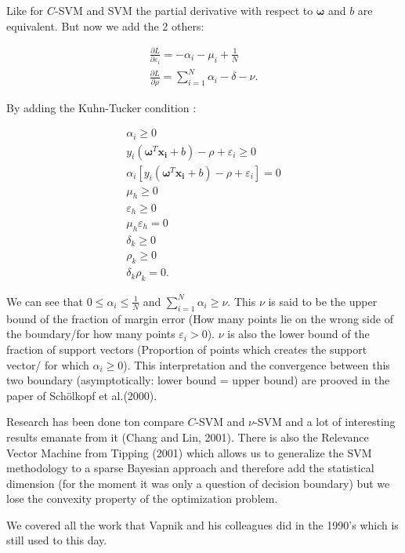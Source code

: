 \documentclass[a4paper,12pt]{article}
\numberwithin{equation}{section}
\begin{document}
Like for $C$-SVM and SVM the partial derivative with respect to $\boldsymbol{\omega}$ and $b$ are equivalent. But now we add the 2 others:

\begin{align*}
 \frac{\partial L}{\partial{\varepsilon_i} } = -\alpha_i - \mu_i + \frac{1}{N}\\
 \frac{\partial L}{\partial{\rho} } = \sum_{i=1}^{N}\alpha_i - \delta - \nu.  
\end{align*}


By adding the Kuhn-Tucker condition :

\begin{align*}
  \alpha_i \geq 0 \\
  y_i(\boldsymbol{\omega}^T\boldsymbol{x_i}+b)-\rho + \varepsilon_i \geq 0 \\
  \alpha_i[y_i(\boldsymbol{\omega}^T\boldsymbol{x_i}+b)-\rho + \varepsilon_i] = 0 \\
  \mu_h \geq 0 \\
  \varepsilon_h \geq 0 \\
  \mu_h\varepsilon_h = 0 \\
  \delta_k \geq 0 \\
  \rho_k \geq 0 \\
  \delta_k\rho_k = 0.
\end{align*}

We can see that $ 0 \leq \alpha_i \leq \frac{1}{N} $ and $\sum_{i=1}^N\alpha_i \geq \nu $. This $\nu$ is said to be the upper bound of the fraction of margin error (How many points lie on the wrong side of the boundary/for how many points $ \varepsilon_i > 0$). $\nu$ is also the lower bound of the fraction of support vectors (Proportion of points which creates the support vector/ for which $\alpha_i \ge 0$). This interpretation and the convergence between this two boundary (asymptotically: lower bound = upper bound) are prooved in the paper of Sch{\"o}lkopf et al.(2000).

Research has been done ton compare $C$-SVM and $\nu$-SVM and a lot of interesting results emanate from it (Chang and Lin, 2001). There is also the Relevance Vector Machine from Tipping (2001) which allows us to generalize the SVM methodology to a sparse Bayesian approach and therefore add the statistical dimension (for the moment it was only a question of decision boundary) but we lose the convexity property of the optimization problem. \par
We covered all the work that Vapnik and his colleagues did in the 1990's which is still used to this day. 
\end{document}
